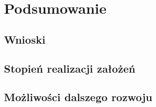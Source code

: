 \clearpage %

\section{Podsumowanie}

\subsection{Wnioski}

\subsection{Stopień realizacji założeń}

\subsection{Możliwości dalszego rozwoju}
